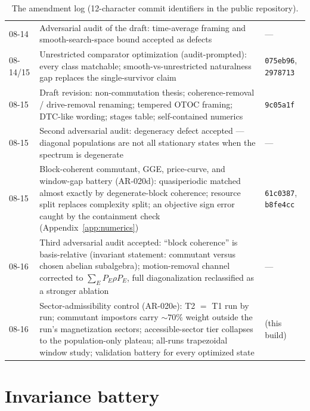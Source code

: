 \documentclass[a4paper,11pt,noarxiv]{quantumarticle}
\begin{document}
\begin{table}[t]
\begin{tabular}{@{}p{1.25cm}p{9.55cm}p{2.55cm}@{}}
08-14 & Adversarial audit of the draft: time-average framing and
smooth-search-space bound accepted as defects &
--- \\
08-14/15 & Unrestricted comparator optimization (audit-prompted):
every class matchable; smooth-vs-unrestricted naturalness gap replaces
the single-survivor claim & \texttt{075eb96},
\texttt{2978713} \\
08-15 & Draft revision: non-commutation thesis; coherence-removal /
drive-removal renaming; tempered OTOC framing; DTC-like wording;
stages table; self-contained numerics & \texttt{9c05a1f} \\
08-15 & Second adversarial audit: degeneracy defect accepted ---
diagonal populations are not all stationary states when the spectrum
is degenerate & --- \\
08-15 & Block-coherent commutant, GGE, price-curve, and window-gap
battery (AR-020d): quasiperiodic matched almost exactly by
degenerate-block coherence; resource split replaces complexity split;
an objective sign error caught by the containment check
(Appendix~\ref{app:numerics}) & \texttt{61c0387},
\texttt{b8fe4cc} \\
08-16 & Third adversarial audit accepted: ``block coherence'' is
basis-relative (invariant statement: commutant versus chosen abelian
subalgebra); motion-removal channel corrected to $\sum_E P_E\rho P_E$,
full diagonalization reclassified as a stronger ablation & --- \\
08-16 & Sector-admissibility control (AR-020e): T2 $=$ T1 run by run;
commutant impostors carry $\sim\!70\%$ weight outside the run's
magnetization sectors; accessible-sector tier collapses to the
population-only plateau; all-runs trapezoidal window study; validation
battery for every optimized state & (this build) \\
\bottomrule
\end{tabular}
\caption{The amendment log (12-character commit identifiers in the
public repository).}
\label{tab:log}
\end{table}

\section{Invariance battery}\label{app:battery}
\end{document}
